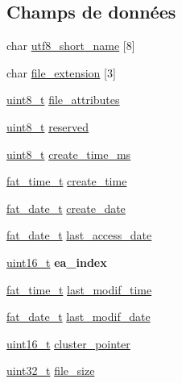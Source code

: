 \subsection*{Champs de données}
\begin{DoxyCompactItemize}
\item 
char \hyperlink{struct__fat__dir__entry_abb18201b12e6039275e6dad91c19a99d}{utf8\-\_\-short\-\_\-name} \mbox{[}8\mbox{]}
\item 
char \hyperlink{struct__fat__dir__entry_addf0d1b2feefb5d50d90ea66b06703b9}{file\-\_\-extension} \mbox{[}3\mbox{]}
\item 
\hyperlink{types_8h_aba7bc1797add20fe3efdf37ced1182c5}{uint8\-\_\-t} \hyperlink{struct__fat__dir__entry_a4672718a4c89a279dd1c2b083ea73789}{file\-\_\-attributes}
\item 
\hyperlink{types_8h_aba7bc1797add20fe3efdf37ced1182c5}{uint8\-\_\-t} \hyperlink{struct__fat__dir__entry_a27e7962cefa12233338034dff3d75304}{reserved}
\item 
\hyperlink{types_8h_aba7bc1797add20fe3efdf37ced1182c5}{uint8\-\_\-t} \hyperlink{struct__fat__dir__entry_a54232a69203bce440a4bfaca30abcd00}{create\-\_\-time\-\_\-ms}
\item 
\hyperlink{fat__internal_8h_ab864004b9f8da2db1862a0da9acb1735}{fat\-\_\-time\-\_\-t} \hyperlink{struct__fat__dir__entry_a3c6cbf375afefcf8fc1518d5a96790a8}{create\-\_\-time}
\item 
\hyperlink{fat__internal_8h_a50b52e2d394a6d7c7f1f2b7c7ef93a19}{fat\-\_\-date\-\_\-t} \hyperlink{struct__fat__dir__entry_ac30b1ec037ee7658eda85b2dc09e5c2e}{create\-\_\-date}
\item 
\hyperlink{fat__internal_8h_a50b52e2d394a6d7c7f1f2b7c7ef93a19}{fat\-\_\-date\-\_\-t} \hyperlink{struct__fat__dir__entry_aa53da680ae2a6594c0f956c80a1b8ca4}{last\-\_\-access\-\_\-date}
\item 
\hypertarget{struct__fat__dir__entry_a4e4d3ec0d8662c572bb2ac7f9c4bc4c8}{\hyperlink{types_8h_adf4d876453337156dde61095e1f20223}{uint16\-\_\-t} {\bfseries ea\-\_\-index}}\label{struct__fat__dir__entry_a4e4d3ec0d8662c572bb2ac7f9c4bc4c8}

\item 
\hyperlink{fat__internal_8h_ab864004b9f8da2db1862a0da9acb1735}{fat\-\_\-time\-\_\-t} \hyperlink{struct__fat__dir__entry_a967f3fe06020a24a22bc83cb80637669}{last\-\_\-modif\-\_\-time}
\item 
\hyperlink{fat__internal_8h_a50b52e2d394a6d7c7f1f2b7c7ef93a19}{fat\-\_\-date\-\_\-t} \hyperlink{struct__fat__dir__entry_a9be27b92458730fbdf5342f717aadc32}{last\-\_\-modif\-\_\-date}
\item 
\hyperlink{types_8h_adf4d876453337156dde61095e1f20223}{uint16\-\_\-t} \hyperlink{struct__fat__dir__entry_ae129dc6a378e1bec5c92a3963d6522c6}{cluster\-\_\-pointer}
\item 
\hyperlink{types_8h_a33594304e786b158f3fb30289278f5af}{uint32\-\_\-t} \hyperlink{struct__fat__dir__entry_a557cd14b001d64851ad5e7cadb742411}{file\-\_\-size}
\end{DoxyCompactItemize}



